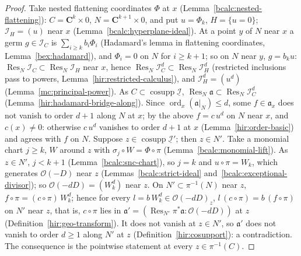 \begin{proof}
\mixedleanok
Take nested flattening coordinates \(\Phi\) at \(x\) (Lemma~\ref{bcalc:nested-flattening}): \(C=\mathbf C^k\times0\), \(N=\mathbf C^{k+1}\times0\), and put
\(u=\Phi_k\), \(H=\{u=0\}\); \(\mathcal I_H=(u)\) near \(x\) (Lemma~\ref{bcalc:hyperplane-ideal}). At a point \(y\) of \(N\) near \(x\) a germ \(g\in\mathcal I_C\) is
\(\sum_{i\ge k}b_i\Phi_i\) (Hadamard's lemma in flattening coordinates, Lemma~\ref{bex:hadamard}), and \(\Phi_i=0\) on \(N\) for \(i\ge k+1\); so on \(N\) near \(y\),
\(g=b_ku\): \(\operatorname{Res}_N\mathcal I_C\subset\operatorname{Res}_N\mathcal I_H\) near \(x\), hence \(\operatorname{Res}_N\mathcal I_C^d\subset\operatorname{Res}_N\mathcal I_H^d\)
(restricted inclusions pass to powers, Lemma~\ref{hir:restricted-calculus}), and \(\mathcal I_H^d=(u^d)\) (Lemma~\ref{mc:principal-power}). As
\(C\subset\operatorname{cosupp}\underline{\mathcal I}\), \(\operatorname{Res}_N\mathfrak a\subset\operatorname{Res}_N\mathcal I_C^d\) (Lemma~\ref{hir:hadamard-bridge-along}).
Since \(\operatorname{ord}_x(\mathfrak a|_N)\le d\), some \(f\in\mathfrak a_x\) does not vanish to order \(d+1\) along \(N\) at \(x\); by the above \(f=c\,u^d\) on \(N\)
near \(x\), and \(c(x)\ne0\): otherwise \(c\,u^d\) vanishes to order \(d+1\) at \(x\) (Lemma~\ref{hir:order-basic}) and agrees with \(f\) on \(N\).
Suppose \(z\in\operatorname{cosupp}\underline{\mathcal I}'\); then \(z\in N'\). Take a monomial chart \(j\ge k\), \(W\) around \(z\) with \(\sigma_j\circ W=\Phi\circ\pi\)
(Lemma~\ref{bcalc:monomial-lift}). As \(z\in N'\), \(j<k+1\) (Lemma~\ref{bcalc:snc-chart}), so \(j=k\) and \(u\circ\pi=W_k\), which generates \(\mathcal O(-D)\) near
\(z\) (Lemmas~\ref{bcalc:strict-ideal} and~\ref{bcalc:exceptional-divisor}); so \(\mathcal O(-dD)=(W_k^d)\) near \(z\). On \(N'\subset\pi^{-1}(N)\) near \(z\),
\(f\circ\pi=(c\circ\pi)\,W_k^d\); hence for every \(l=b\,W_k^d\in\mathcal O(-dD)_z\), \(l\,(c\circ\pi)=b\,(f\circ\pi)\) on \(N'\) near \(z\), that is,
\(c\circ\pi\) lies in \(\mathfrak a'=(\operatorname{Res}_{N'}\pi^*\mathfrak a:\mathcal O(-dD))\) at \(z\) (Definition~\ref{hir:geo-transform}). It does not vanish at
\(z\in N'\), so \(\mathfrak a'\) does not vanish to order \(d\ge1\) along \(N'\) at \(z\) (Definition~\ref{hir:cosupport}): a contradiction. The consequence is the
pointwise statement at every \(z\in\pi^{-1}(C)\).
\end{proof}

